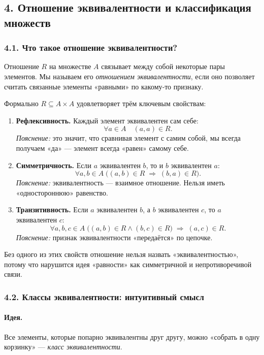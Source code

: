 \subsection{4. Отношение эквивалентности и классификация множеств}

\subsubsection{4.1. Что такое отношение эквивалентности?}

Отношение $R$ на множестве $A$ связывает между собой некоторые пары элементов.  
Мы называем его \emph{отношением эквивалентности}, если оно позволяет считать связанные элементы «равными» по какому‑то признаку.  

Формально $R\subseteq A\times A$ удовлетворяет трём ключевым свойствам:

\begin{enumerate}[label=\arabic*)]
  \item \textbf{Рефлексивность.}  
    Каждый элемент эквивалентен сам себе:
    \[
      \forall a\in A\quad (a,a)\in R.
    \]
    \emph{Пояснение:} это значит, что сравнивая элемент с самим собой, мы всегда получаем «да» — элемент всегда «равен» самому себе.

  \item \textbf{Симметричность.}  
    Если $a$ эквивалентен $b$, то и $b$ эквивалентен $a$:
    \[
      \forall a,b\in A\;\bigl((a,b)\in R \;\Rightarrow\; (b,a)\in R\bigr).
    \]
    \emph{Пояснение:} эквивалентность — взаимное отношение. Нельзя иметь «одностороннюю» равенство.

  \item \textbf{Транзитивность.}  
    Если $a$ эквивалентен $b$, а $b$ эквивалентен $c$, то $a$ эквивалентен $c$:
    \[
      \forall a,b,c\in A\;\bigl((a,b)\in R \wedge (b,c)\in R\bigr) \;\Rightarrow\; (a,c)\in R.
    \]
    \emph{Пояснение:} признак эквивалентности «передаётся» по цепочке.
\end{enumerate}

Без одного из этих свойств отношение нельзя назвать «эквивалентностью», потому что нарушится идея «равности» как симметричной и непротиворечивой связи.

\subsubsection{4.2. Классы эквивалентности: интуитивный смысл}

\paragraph{Идея.} Все элементы, которые попарно эквивалентны друг другу, можно «собрать в одну корзинку» — \emph{класс эквивалентности}.  

